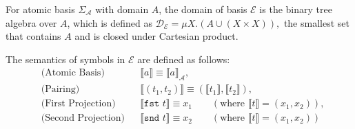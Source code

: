 \documentclass[manuscript, review, timestamp]{acmart}
\newcommand*{\fst}{\texttt{fst }}
\newcommand*{\snd}{\texttt{snd }}
\newcommand*{\sem}[1]{\llbracket #1 \rrbracket}
\begin{document}
\begin{definition}
  For atomic basis $\Sigma_\mathcal{A}$ with domain $A$, the domain of basis $\mathcal{E}$ is the binary tree algebra over $A$, which is defined as 
  $
  \mathcal{D}_\mathcal{E} = \mu X.(A \cup (X \times X)),
  $
  the smallest set that contains $A$ and is closed under Cartesian product.

  The semantics of symbols in $\mathcal{E}$ are defined as follows:
  \begin{align*}
    & \text{(Atomic Basis)} && \sem{a} \equiv \sem{a}_\mathcal{A}, \\
    & \text{(Pairing)} &&
    \sem{(t_1, t_2)} \equiv (\sem{t_1}, \sem{t_2}), \\
    & \text{(First Projection)} &&
    \sem{\fst t} \equiv x_1 \qquad (\text{where } \sem{t} = (x_1, x_2)), \\
    & \text{(Second Projection)} &&
    \sem{\snd t} \equiv x_2 \qquad (\text{where } \sem{t} = (x_1, x_2))
  \end{align*}
\end{definition}


\end{document}

